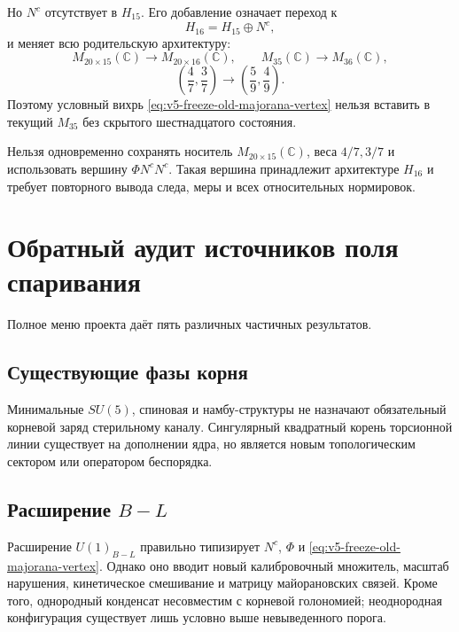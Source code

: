 Но $N^c$ отсутствует в $H_{15}$. Его добавление означает переход к
\begin{equation}
 H_{16}=H_{15}\oplus N^c,
\end{equation}
и меняет всю родительскую архитектуру:
\begin{equation}
 M_{20\times15}(\mathbb C)\longrightarrow
 M_{20\times16}(\mathbb C),
 \qquad
 M_{35}(\mathbb C)\longrightarrow M_{36}(\mathbb C),
 \label{eq:v5-freeze-h15-h16-carrier}
\end{equation}
\begin{equation}
 \left(\frac47,\frac37\right)
 \longrightarrow
 \left(\frac59,\frac49\right).
 \label{eq:v5-freeze-h15-h16-weights}
\end{equation}
Поэтому условный вихрь \eqref{eq:v5-freeze-old-majorana-vertex} нельзя
вставить в текущий $M_{35}$ без скрытого шестнадцатого состояния.

\begin{nogocriterion}
Нельзя одновременно сохранять носитель $M_{20\times15}(\mathbb C)$, веса
$4/7,3/7$ и использовать вершину $\Phi N^cN^c$. Такая вершина принадлежит
архитектуре $H_{16}$ и требует повторного вывода следа, меры и всех
относительных нормировок.
\end{nogocriterion}

\section{Обратный аудит источников поля спаривания}

Полное меню проекта даёт пять различных частичных результатов.

\subsection{Существующие фазы корня}

Минимальные $SU(5)$, спиновая и намбу-структуры не назначают обязательный
корневой заряд стерильному каналу. Сингулярный квадратный корень
торсионной линии существует на дополнении ядра, но является новым
топологическим сектором или оператором беспорядка.

\subsection{Расширение \texorpdfstring{$B-L$}{B-L}}

Расширение $U(1)_{B-L}$ правильно типизирует $N^c$, $\Phi$ и
\eqref{eq:v5-freeze-old-majorana-vertex}. Однако оно вводит новый
калибровочный множитель, масштаб нарушения, кинетическое смешивание и
матрицу майорановских связей. Кроме того, однородный конденсат несовместим
с корневой голономией; неоднородная конфигурация существует лишь условно
выше невыведенного порога.


